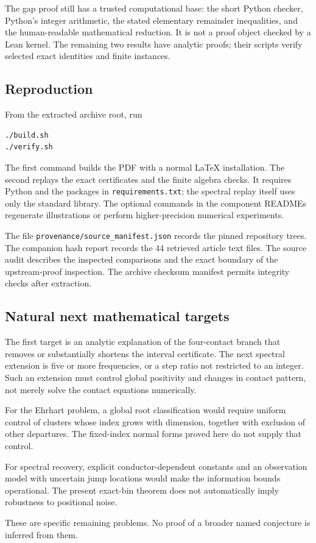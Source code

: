 The gap proof still has a trusted computational base: the short Python
checker, Python's integer arithmetic, the stated elementary remainder
inequalities, and the human-readable mathematical reduction.
It is not a proof object checked by a Lean kernel.
The remaining two results have analytic proofs; their scripts verify
selected exact identities and finite instances.

\subsection{Reproduction}
From the extracted archive root, run
\begin{verbatim}
./build.sh
./verify.sh
\end{verbatim}
The first command builds the PDF with a normal LaTeX installation.
The second replays the exact certificates and the finite algebra checks.
It requires Python and the packages in \texttt{requirements.txt};
the spectral replay itself uses only the standard library.
The optional commands in the component READMEs regenerate illustrations
or perform higher-precision numerical experiments.

The file \texttt{provenance/source\_manifest.json} records the pinned
repository trees. The companion hash report records the 44 retrieved
article text files. The source audit describes the inspected comparisons
and the exact boundary of the upstream-proof inspection.
The archive checksum manifest permits integrity checks after extraction.

\subsection{Natural next mathematical targets}
The first target is an analytic explanation of the four-contact branch
that removes or substantially shortens the interval certificate.
The next spectral extension is five or more frequencies, or a step
ratio not restricted to an integer. Such an extension must control
global positivity and changes in contact pattern, not merely solve
the contact equations numerically.

For the Ehrhart problem, a global root classification would require
uniform control of clusters whose index grows with dimension, together
with exclusion of other departures. The fixed-index normal forms
proved here do not supply that control.

For spectral recovery, explicit conductor-dependent constants and an
observation model with uncertain jump locations would make the
information bounds operational. The present exact-bin theorem does not
automatically imply robustness to positional noise.

These are specific remaining problems. No proof of a broader named
conjecture is inferred from them.
